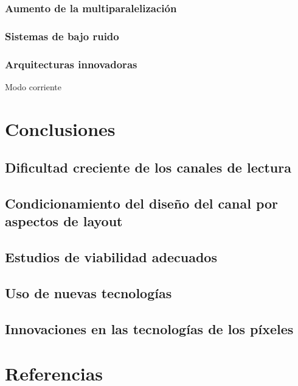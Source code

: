 \documentclass[12pt,a4paper,oneside,titlepage]{report}
\begin{document}
\subsection{Aumento de la multiparalelización}

\subsection{Sistemas de bajo ruido}

\subsection{Arquitecturas innovadoras}
Modo corriente

\chapter{Conclusiones}

\section{Dificultad creciente de los canales de lectura}

\section{Condicionamiento del diseño del canal por aspectos de layout}

\section{Estudios de viabilidad adecuados}

\section{Uso de nuevas tecnologías}

\section{Innovaciones en las tecnologías de los píxeles}

\chapter{Referencias}
\end{document}
